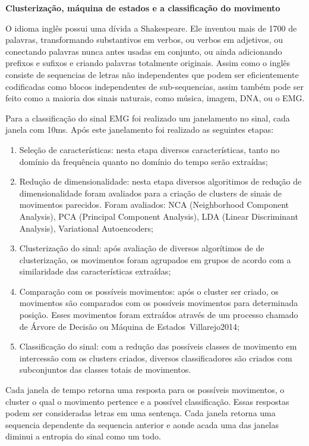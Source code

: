 \documentclass[a4paper, 12pt]{ppgeb}
\begin{document}
\textbf{Clusterização, máquina de estados e a classificação do movimento}

O idioma inglês possui uma dívida a Shakespeare. Ele inventou mais de 1700 de palavras, transformando substantivos em verbos, ou verbos em adjetivos, ou conectando palavras nunca antes usadas em conjunto, ou ainda adicionando prefixos e sufixos e criando palavras totalmente originais. Assim como o inglês consiste de sequencias de letras não independentes que podem ser eficientemente codificadas como blocos independentes de sub-sequencias, assim também pode ser feito como a maioria dos sinais naturais, como música, imagem, DNA, ou o EMG.

Para a classificação do sinal EMG foi realizado um janelamento no sinal, cada janela com 10ms. Após este janelamento foi realizado as seguintes etapas:
 
\begin{enumerate}
    \item Seleção de características: nesta etapa diversos características, tanto no domínio da frequência quanto no domínio do tempo serão extraídas;
    \item Redução de dimensionalidade: nesta etapa diversos algoritimos de redução de dimensionalidade foram avaliados para a criação de clusters de sinais de movimentos parecidos. Foram avaliados:  NCA (Neighborhood Component Analysis), PCA (Principal Component Analysis), LDA (Linear Discriminant Analysis), Variational Autoencoders;
    \item Clusterização do sinal: após avaliação de diversos algorítimos de de clusterização, os movimentos foram agrupados em grupos de acordo com a similaridade das características extraídas;
    \item Comparação com os possíveis movimentos: após o cluster ser criado, os movimentos são comparados com os possíveis movimentos para determinada posição. Esses movimentos foram extraídos através de um processo chamado de Árvore de Decisão ou Máquina de Estados~\cite{resumoestendido}{Villarejo2014};
    \item Classificação do sinal: com a redução das possíveis classes de movimento em intercessão com os clusters criados, diversos classificadores são criados com subconjuntos das classes totais de movimentos.
\end{enumerate}

Cada janela de tempo retorna uma resposta para os possíveis movimentos, o cluster o qual o movimento pertence e a possível classificação. Essas respostas podem ser consideradas letras em uma sentença. Cada janela retorna uma sequencia dependente da sequencia anterior e aonde acada uma das janelas diminui a entropia do sinal como um todo.
\end{document}

